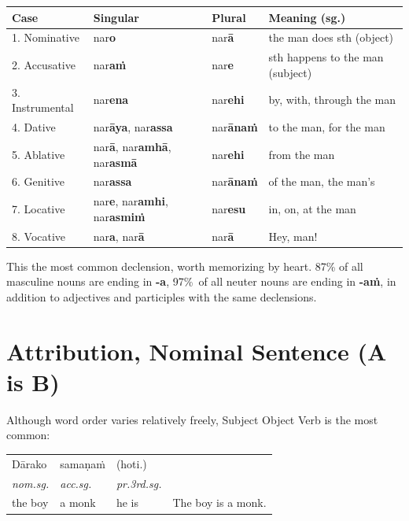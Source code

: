 \documentclass[11pt,oneside]{memoir}
\begin{document}
\begin{center}
\begin{tabular}{llll}
Case & Singular & Plural & Meaning (sg.)\\[0pt]
\hline
1. Nominative & nar\textbf{o} & nar\textbf{ā} & the man does sth (object)\\[0pt]
2. Accusative & nar\textbf{aṁ} & nar\textbf{e} & sth happens to the man (subject)\\[0pt]
3. Instrumental & nar\textbf{ena} & nar\textbf{ehi} & by, with, through the man\\[0pt]
4. Dative & nar\textbf{āya}, nar\textbf{assa} & nar\textbf{ānaṁ} & to the man, for the man\\[0pt]
5. Ablative & nar\textbf{ā}, nar\textbf{amhā}, nar\textbf{asmā} & nar\textbf{ehi} & from the man\\[0pt]
6. Genitive & nar\textbf{assa} & nar\textbf{ānaṁ} & of the man, the man's\\[0pt]
7. Locative & nar\textbf{e}, nar\textbf{amhi}, nar\textbf{asmiṁ} & nar\textbf{esu} & in, on, at the man\\[0pt]
8. Vocative & nar\textbf{a}, nar\textbf{ā} & nar\textbf{ā} & Hey, man!\\[0pt]
\end{tabular}
\end{center}

This the most common declension, worth memorizing by heart. 87\% of all masculine
nouns are ending in \textbf{-a}, \mbox{97\% of} all neuter nouns are ending in \textbf{-aṁ}, in
addition to adjectives and participles with the same declensions.

\section{Attribution, Nominal Sentence (A is B)}
\label{sec:org6312650}

Although word order varies relatively freely, Subject Object Verb is the most common:

\begin{center}
\begin{tabular}{llll}
Dārako & samaṇaṁ & (hoti.) & \\[0pt]
\emph{nom.sg.} & \emph{acc.sg.} & \emph{pr.3rd.sg.} & \\[0pt]
the boy & a monk & he is & The boy is a monk.\\[0pt]
\end{tabular}
\end{center}
\end{document}
